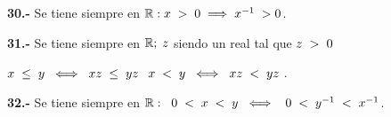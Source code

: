 \documentclass[12pt]{article}
\begin{document}
\textbf{30.-} Se tiene siempre en $\mathbb{R}: x \hspace{0.1cm}>\hspace{0.1cm}0\hspace{0.1cm}\Longrightarrow\hspace{0.1cm} x^{-1}\hspace{0.1cm}>0$.

\vspace{0.2cm}

\textbf{31.-} Se tiene siempre en $\mathbb{R}; \hspace{0.1cm} z$ siendo un real tal que $z\hspace{0.1cm}>\hspace{0.1cm}0$ \vspace{0.1cm}

\hspace{0.8cm}$x \hspace{0.1cm}\leq \hspace{0.1cm} y \hspace{0.2cm} \Longleftrightarrow \hspace{0.2cm} xz\hspace{0.1cm} \leq\hspace{0.1cm} yz\hspace{0.1cm}$ \hspace{1cm} $x \hspace{0.1cm}< \hspace{0.1cm} y \hspace{0.2cm} \Longleftrightarrow \hspace{0.2cm} xz\hspace{0.1cm} <\hspace{0.1cm} yz\hspace{0.1cm}$.
\vspace{0.2cm}

\textbf{32.-} Se tiene siempre en $\mathbb{R}: \hspace{0.2cm} 0\hspace{0.1cm}<\hspace{0.1cm}x\hspace{0.1cm}<\hspace{0.1cm}y\hspace{0.2cm}\Longleftrightarrow\hspace{0.2cm}\hspace{0.1cm} 0\hspace{0.1cm}<\hspace{0.1cm}y^{-1}\hspace{0.1cm}<\hspace{0.1cm}x^{-1}$. \vspace{0.2cm}
\end{document}
